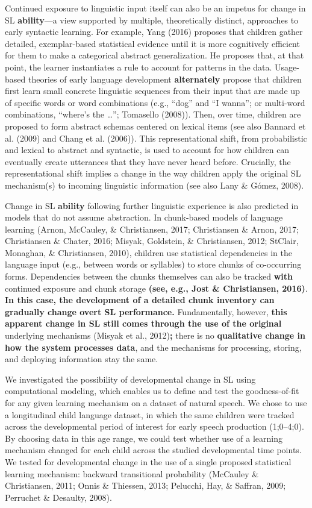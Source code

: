 \documentclass[man,mask,floatsintext]{apa6}
\begin{document}
Continued exposure to linguistic input itself can also be an impetus for
change in SL \textbf{ability}---a view supported by multiple,
theoretically distinct, approaches to early syntactic learning. For
example, Yang (2016) proposes that children gather detailed,
exemplar-based statistical evidence until it is more cognitively
efficient for them to make a categorical abstract generalization. He
proposes that, at that point, the learner instantiates a rule to account
for patterns in the data. Usage-based theories of early language
development \textbf{alternately} propose that children first learn small
concrete linguistic sequences from their input that are made up of
specific words or word combinations (e.g., \enquote{dog} and \enquote{I
wanna}; or multi-word combinations, \enquote{where's the \ldots{}};
Tomasello (2008)). Then, over time, children are proposed to form
abstract schemas centered on lexical items (see also Bannard et al.
(2009) and Chang et al. (2006)). This representational shift, from
probabilistic and lexical to abstract and syntactic, is used to account
for how children can eventually create utterances that they have never
heard before. Crucially, the representational shift implies a change in
the way children apply the original SL mechanism(s) to incoming
linguistic information (see also Lany \& Gómez, 2008).

Change in SL \textbf{ability} following further linguistic experience is
also predicted in models that do not assume abstraction. In chunk-based
models of language learning (Arnon, McCauley, \& Christiansen, 2017;
Christiansen \& Arnon, 2017; Christiansen \& Chater, 2016; Misyak,
Goldstein, \& Christiansen, 2012; StClair, Monaghan, \& Christiansen,
2010), children use statistical dependencies in the language input
(e.g., between words or syllables) to store chunks of co-occurring
forms. Dependencies between the chunks themselves can also be tracked
\textbf{with} continued exposure and chunk storage \textbf{(see, e.g.,
Jost \& Christiansen, 2016)}. \textbf{In this case, the development of a
detailed chunk inventory can gradually change overt SL performance.
}Fundamentally, however, \textbf{this apparent change in SL still comes
through the use of the original} underlying mechanisms (Misyak et al.,
2012)\textbf{;} there is no \textbf{qualitative change in how the system
processes data}, and the mechanisms for processing, storing, and
deploying information stay the same.

We investigated the possibility of developmental change in SL using
computational modeling, which enables us to define and test the
goodness-of-fit for any given learning mechanism on a dataset of natural
speech. We chose to use a longitudinal child language dataset, in which
the same children were tracked across the developmental period of
interest for early speech production (1;0--4;0). By choosing data in
this age range, we could test whether use of a learning mechanism
changed for each child across the studied developmental time points. We
tested for developmental change in the use of a single proposed
statistical learning mechanism: backward transitional probability
(McCauley \& Christiansen, 2011; Onnis \& Thiessen, 2013; Pelucchi, Hay,
\& Saffran, 2009; Perruchet \& Desaulty, 2008).
\end{document}
